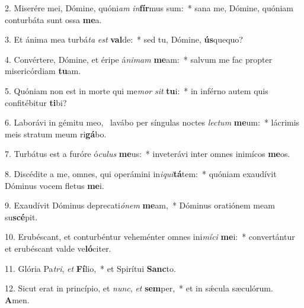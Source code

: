 2. Miserére mei, Dómine, quóni\textit{am} \textit{in}\textbf{fír}mus sum:~*  sana me, Dómine, quóniam conturbáta sunt ossa \textbf{me}a.\

3. Et ánima mea turbá\textit{ta} \textit{est} \textbf{val}de:~*  sed tu, Dómine, \textbf{ús}quequo?\

4. Convértere, Dómine, et éripe á\textit{ni}\textit{mam} \textbf{me}am:~*  salvum me fac propter misericórdiam \textbf{tu}am.\

5. Quóniam non est in morte qui me\textit{mor} \textit{sit} \textbf{tu}i:~*  in inférno autem quis confitébitur \textbf{ti}bi?\

6. Laborávi in gémitu meo, \dag\  lavábo per síngulas noctes \textit{lec}\textit{tum} \textbf{me}um:~*  lácrimis meis stratum meum ri\textbf{gá}bo.\

7. Turbátus est a furóre ó\textit{cu}\textit{lus} \textbf{me}us:~*  inveterávi inter omnes inimícos \textbf{me}os.\

8. Discédite a me, omnes, qui operámini in\textit{i}\textit{qui}\textbf{tá}tem:~*  quóniam exaudívit Dóminus vocem fletus \textbf{me}i.\

9. Exaudívit Dóminus deprecati\textit{ó}\textit{nem} \textbf{me}am,~*  Dóminus oratiónem meam su\textbf{scé}pit.\

10. Erubéscant, et conturbéntur veheménter omnes ini\textit{mí}\textit{ci} \textbf{me}i:~*  convertántur et erubéscant valde ve\textbf{ló}citer.\

11. Glória Pa\textit{tri}, \textit{et} \textbf{Fí}lio,~*  et Spirítui \textbf{Sanc}to.\

12. Sicut erat in princípio, et \textit{nunc}, \textit{et} \textbf{sem}per,~*  et in sǽcula sæculórum. \textbf{A}men.\

